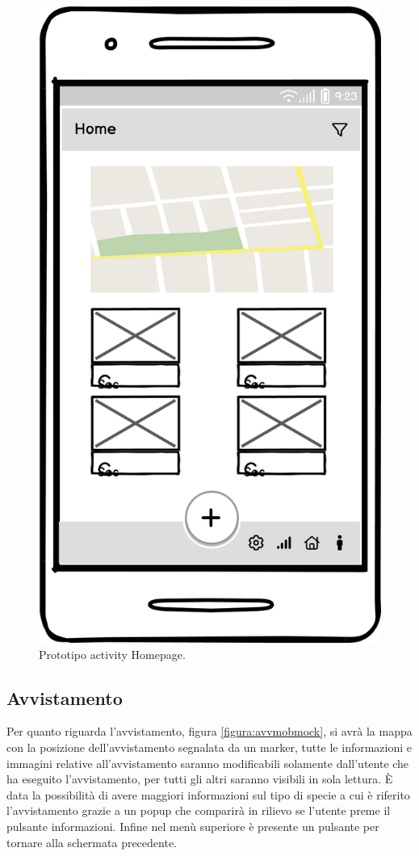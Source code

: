 \documentclass[a4paper,final,12pt]{report}
\begin{document}
\begin{figure}[hbtp]
\centering
\includegraphics[scale=0.40]{img_concettuale/Home_mob.png}
\caption{Prototipo activity Homepage.}
\label{figura:homemobsinasd}
\end{figure}


\subsection{Avvistamento}
Per quanto riguarda l'avvistamento, figura \ref{figura:avvmobmock}, si avrà la mappa con la posizione dell'avvistamento segnalata da un marker, tutte le informazioni e immagini relative all'avvistamento saranno modificabili solamente dall'utente che ha eseguito l'avvistamento, per tutti gli altri saranno visibili in sola lettura. È data la possibilità di avere maggiori informazioni sul tipo di specie a cui è riferito l'avvistamento grazie a un popup che comparirà in rilievo se l'utente preme il pulsante informazioni. Infine nel menù superiore è presente un pulsante per tornare alla schermata precedente.
\end{document}
